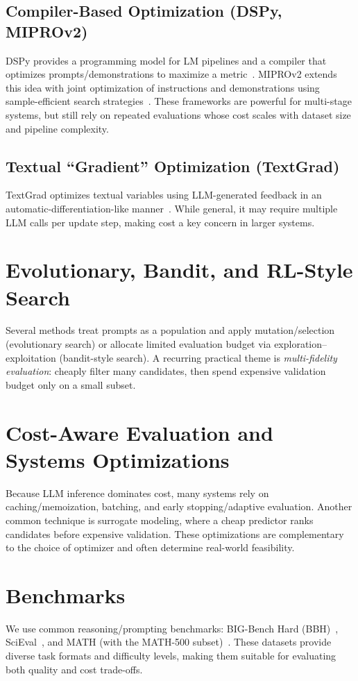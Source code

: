 \subsection{Compiler-Based Optimization (DSPy, MIPROv2)}
DSPy provides a programming model for LM pipelines and a compiler that optimizes prompts/demonstrations to maximize a metric~\citep{khattab2023dspy}. MIPROv2 extends this idea with joint optimization of instructions and demonstrations using sample-efficient search strategies~\citep{khattab2024miprov2}. These frameworks are powerful for multi-stage systems, but still rely on repeated evaluations whose cost scales with dataset size and pipeline complexity.

\subsection{Textual ``Gradient'' Optimization (TextGrad)}
TextGrad optimizes textual variables using LLM-generated feedback in an automatic-differentiation-like manner~\citep{yuksekgonul2024textgrad}. While general, it may require multiple LLM calls per update step, making cost a key concern in larger systems.

\section{Evolutionary, Bandit, and RL-Style Search}
Several methods treat prompts as a population and apply mutation/selection (evolutionary search) or allocate limited evaluation budget via exploration--exploitation (bandit-style search). A recurring practical theme is \emph{multi-fidelity evaluation}: cheaply filter many candidates, then spend expensive validation budget only on a small subset.

\section{Cost-Aware Evaluation and Systems Optimizations}
Because LLM inference dominates cost, many systems rely on caching/memoization, batching, and early stopping/adaptive evaluation. Another common technique is surrogate modeling, where a cheap predictor ranks candidates before expensive validation. These optimizations are complementary to the choice of optimizer and often determine real-world feasibility.

\section{Benchmarks}
We use common reasoning/prompting benchmarks: BIG-Bench Hard (BBH)~\citep{suzgun2022bbh}, SciEval~\citep{sun2023scieval}, and MATH (with the MATH-500 subset)~\citep{hendrycks2021math}. These datasets provide diverse task formats and difficulty levels, making them suitable for evaluating both quality and cost trade-offs.

